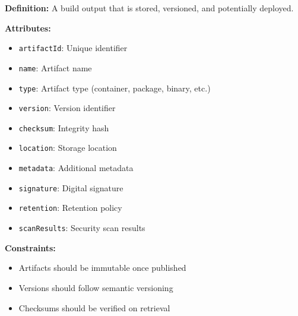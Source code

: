 \documentclass[11pt,letterpaper]{article}
\begin{document}
\begin{definitionbox}
\textbf{Definition:} A build output that is stored, versioned, and potentially deployed.

\textbf{Attributes:}
\begin{itemize}[nosep]
    \item \texttt{artifactId}: Unique identifier
    \item \texttt{name}: Artifact name
    \item \texttt{type}: Artifact type (container, package, binary, etc.)
    \item \texttt{version}: Version identifier
    \item \texttt{checksum}: Integrity hash
    \item \texttt{location}: Storage location
    \item \texttt{metadata}: Additional metadata
    \item \texttt{signature}: Digital signature
    \item \texttt{retention}: Retention policy
    \item \texttt{scanResults}: Security scan results
\end{itemize}

\textbf{Constraints:}
\begin{itemize}[nosep]
    \item Artifacts should be immutable once published
    \item Versions should follow semantic versioning
    \item Checksums should be verified on retrieval
\end{itemize}
\end{definitionbox}
\end{document}
